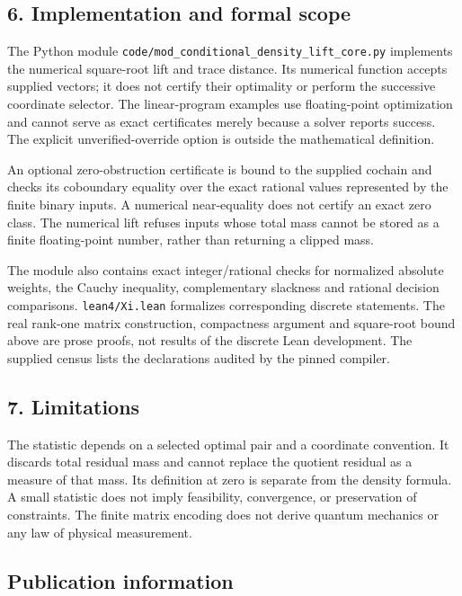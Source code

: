 \documentclass[
]{article}
\begin{document}
\subsection{6. Implementation and formal
scope}\label{implementation-and-formal-scope}

The Python module \nolinkurl{code/mod_conditional_density_lift_core.py}
implements the numerical square-root lift and trace distance. Its
numerical function accepts supplied vectors; it does not certify their
optimality or perform the successive coordinate selector. The
linear-program examples use floating-point optimization and cannot serve
as exact certificates merely because a solver reports success. The
explicit unverified-override option is outside the mathematical
definition.

An optional zero-obstruction certificate is bound to the supplied
cochain and checks its coboundary equality over the exact rational
values represented by the finite binary inputs. A numerical
near-equality does not certify an exact zero class. The numerical lift
refuses inputs whose total mass cannot be stored as a finite
floating-point number, rather than returning a clipped mass.

The module also contains exact integer/rational checks for normalized
absolute weights, the Cauchy inequality, complementary slackness and
rational decision comparisons. \nolinkurl{lean4/Xi.lean} formalizes
corresponding discrete statements. The real rank-one matrix
construction, compactness argument and square-root bound above are prose
proofs, not results of the discrete Lean development. The supplied
census lists the declarations audited by the pinned compiler.

\subsection{7. Limitations}\label{limitations}

The statistic depends on a selected optimal pair and a coordinate
convention. It discards total residual mass and cannot replace the
quotient residual as a measure of that mass. Its definition at zero is
separate from the density formula. A small statistic does not imply
feasibility, convergence, or preservation of constraints. The finite
matrix encoding does not derive quantum mechanics or any law of physical
measurement.

\subsection{Publication information}\label{publication-information}
\end{document}
